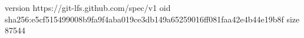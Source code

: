 version https://git-lfs.github.com/spec/v1
oid sha256:e5cf515499008b9fa9f4aba019ce3db149a65259016ff081faa42e4b44e19b8f
size 87544

